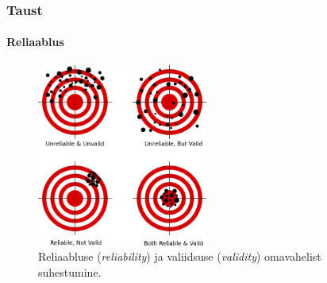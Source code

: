 \documentclass[aspectratio=149]{beamer}
\begin{document}
  \begin{frame}
  	\frametitle{Taust}
    \framesubtitle{Reliaablus}
    \begin{figure}[H]
		\centering
		\includegraphics[width=0.5\textwidth, height = 0.6\textwidth]			{Reliability_and_validity.png}
		\caption{Reliaabluse (\textit{reliability}) ja valiidsuse (\textit{validity}) omavahelist suhestumine. }
		\label{reliability_and_validity}
\end{figure}

  \end{frame}
\end{document}
